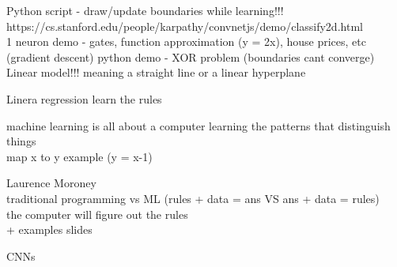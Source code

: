 \documentclass[10pt, compress]{beamer}
\begin{document}
\begin{frame}
  Python script - draw/update boundaries while learning!!! \\
  https://cs.stanford.edu/people/karpathy/convnetjs/demo/classify2d.html \\
  1 neuron demo - gates, function approximation (y = 2x), house prices, etc \\
(gradient descent)
python demo - XOR problem (boundaries cant converge) \\
Linear model!!! meaning a straight line or a linear hyperplane

Linera regression learn the rules \\

\end{frame}

\begin{frame}
machine learning is all about a computer learning the patterns that distinguish things \\
map x to y example (y = x-1)
\end{frame}

\begin{frame}
  Laurence Moroney \\
traditional programming vs ML (rules + data = ans VS ans + data = rules) \\
the computer will figure out the rules \\
+ examples slides
\end{frame}

\begin{frame}
CNNs
\end{frame}
\end{document}

